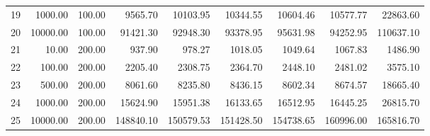 \begin{table}[ht]
\begin{tabular}{rrrrrrrrr}
  19 & 1000.00 & 100.00 & 9565.70 & 10103.95 & 10344.55 & 10604.46 & 10577.77 & 22863.60 \\ 
  20 & 10000.00 & 100.00 & 91421.30 & 92948.30 & 93378.95 & 95631.98 & 94252.95 & 110637.10 \\ 
  21 & 10.00 & 200.00 & 937.90 & 978.27 & 1018.05 & 1049.64 & 1067.83 & 1486.90 \\ 
  22 & 100.00 & 200.00 & 2205.40 & 2308.75 & 2364.70 & 2448.10 & 2481.02 & 3575.10 \\ 
  23 & 500.00 & 200.00 & 8061.60 & 8235.80 & 8436.15 & 8602.34 & 8674.57 & 18665.40 \\ 
  24 & 1000.00 & 200.00 & 15624.90 & 15951.38 & 16133.65 & 16512.95 & 16445.25 & 26815.70 \\ 
  25 & 10000.00 & 200.00 & 148840.10 & 150579.53 & 151428.50 & 154738.65 & 160996.00 & 165816.70 \\ 
   \hline
\end{tabular}
\end{table}
